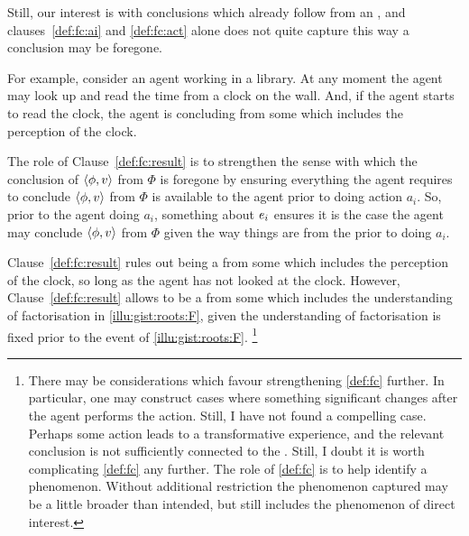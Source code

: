 \begin{note}
  Still, our interest is with conclusions which already follow from an \agpe{}, and clauses~\ref{def:fc:ai} and \ref{def:fc:act} alone does not quite capture this way a conclusion may be foregone.

  For example, consider an agent working in a library.
  At any moment the agent may look up and read the time from a clock on the wall.
  And, if the agent starts to read the clock, the agent is concluding  from some \pool{} which includes the \agents{} perception of the clock.

  The role of Clause~\ref{def:fc:result} is to strengthen the sense with which the conclusion of \(\langle\phi, v\rangle\) from \(\Phi\) is foregone by ensuring everything the agent requires to conclude \(\langle\phi, v\rangle\) from \(\Phi\) is available to the agent prior to doing action \(a_{i}\).
  So, prior to the agent doing \(a_{i}\), something about \(e\sb{i}\) ensures it is the case the agent may conclude \(\langle\phi, v\rangle\) from \(\Phi\) given the way things are from the \agpe{} prior to doing \(a_{i}\).

  Clause~\ref{def:fc:result} rules out  being a \fc{} from some \pool{} which includes the \agents{} perception of the clock, so long as the agent has not looked at the clock.
  However, Clause~\ref{def:fc:result} allows  to be a \fc{} from some \pool{} which includes the \agents{} understanding of factorisation in \autoref{illu:gist:roots:F}, given the \agents{} understanding of factorisation is fixed prior to the event of \autoref{illu:gist:roots:F}.%
  \footnote{
    There may be considerations which favour strengthening \autoref{def:fc} further.
    In particular, one may construct cases where something significant changes after the agent performs the action.
    Still, I have not found a compelling case.
    Perhaps some action leads to a transformative experience, and the relevant conclusion is not sufficiently connected to the .
    Still, I doubt it is worth complicating \autoref{def:fc} any further.
    The role of \autoref{def:fc} is to help identify a phenomenon.
    Without additional restriction the phenomenon captured may be a little broader than intended, but still includes the phenomenon of direct interest.
  }
\end{note}

